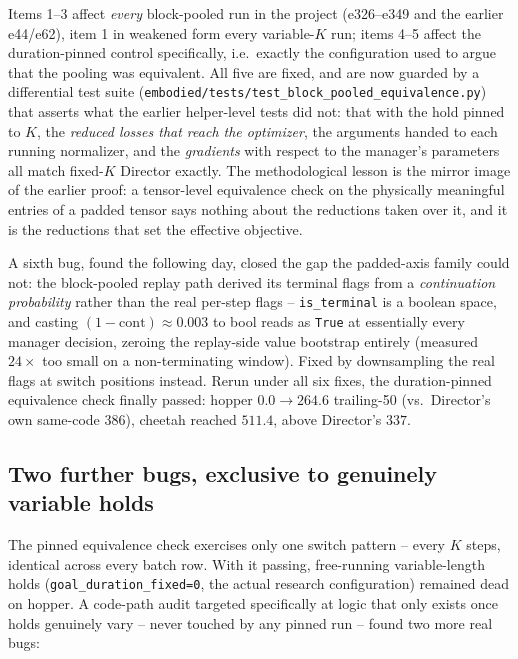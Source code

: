 \documentclass[10pt]{article}
\begin{document}
Items 1--3 affect \emph{every} block-pooled run in the project (e326--e349 and
the earlier e44/e62), item 1 in weakened form every variable-$K$ run; items
4--5 affect the duration-pinned control specifically, i.e.\ exactly the
configuration used to argue that the pooling was equivalent. All five are
fixed, and are now guarded by a differential test suite
(\texttt{embodied/tests/test\_block\_pooled\_equivalence.py}) that asserts what
the earlier helper-level tests did not: that with the hold pinned to $K$, the
\emph{reduced losses that reach the optimizer}, the arguments handed to each
running normalizer, and the \emph{gradients} with respect to the manager's
parameters all match fixed-$K$ Director exactly. The methodological lesson is
the mirror image of the earlier proof: a tensor-level equivalence check on the
physically meaningful entries of a padded tensor says nothing about the
reductions taken over it, and it is the reductions that set the effective
objective.

A sixth bug, found the following day, closed the gap the padded-axis family
could not: the block-pooled replay path derived its terminal flags from a
\emph{continuation probability} rather than the real per-step flags --
\texttt{is\_terminal} is a boolean space, and casting
$(1{-}\mathrm{cont})\approx 0.003$ to bool reads as \texttt{True} at
essentially every manager decision, zeroing the replay-side value bootstrap
entirely (measured $24\times$ too small on a non-terminating window). Fixed by
downsampling the real flags at switch positions instead. Rerun under all six
fixes, the duration-pinned equivalence check finally passed: hopper
$0.0\to264.6$ trailing-50 (vs.\ Director's own same-code $386$), cheetah
reached $511.4$, above Director's $337$.

\subsection{Two further bugs, exclusive to genuinely variable holds}

The pinned equivalence check exercises only one switch pattern -- every $K$
steps, identical across every batch row. With it passing, free-running
variable-length holds (\texttt{goal\_duration\_fixed=0}, the actual research
configuration) remained dead on hopper. A code-path audit targeted
specifically at logic that only exists once holds genuinely vary -- never
touched by any pinned run -- found two more real bugs:
\end{document}
